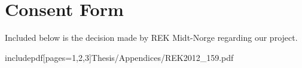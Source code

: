 \chapter{Consent Form}
\label{app:consentform}

Included below is the decision made by REK Midt-Norge regarding our project.

includepdf[pages={1,2,3}]{Thesis/Appendices/REK2012_159.pdf}